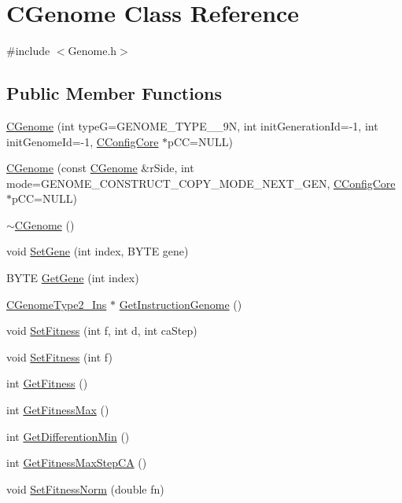 \hypertarget{classCGenome}{
\section{CGenome Class Reference}
\label{classCGenome}
}


{\ttfamily \#include $<$Genome.h$>$}\subsection*{Public Member Functions}
\begin{DoxyCompactItemize}
\item 
\hyperlink{classCGenome_a457e2d373926103a835472d689e8e2e7}{CGenome} (int typeG=GENOME\_\-TYPE\_\_\-9N, int initGenerationId=-\/1, int initGenomeId=-\/1, \hyperlink{classCConfigCore}{CConfigCore} $\ast$pCC=NULL)
\item 
\hyperlink{classCGenome_afe7e2e3d4f8d7640c72a3a392147b08a}{CGenome} (const \hyperlink{classCGenome}{CGenome} \&rSide, int mode=GENOME\_\-CONSTRUCT\_\-COPY\_\-MODE\_\-NEXT\_\-GEN, \hyperlink{classCConfigCore}{CConfigCore} $\ast$pCC=NULL)
\item 
\hyperlink{classCGenome_a6ed12f20c2ca1f53498046b584acb01b}{$\sim$CGenome} ()
\item 
void \hyperlink{classCGenome_ad657f8d74e59406cd4c204de9de7b521}{SetGene} (int index, BYTE gene)
\item 
BYTE \hyperlink{classCGenome_a63ed6158c66292bc3934b8b0321205a7}{GetGene} (int index)
\item 
\hyperlink{classCGenomeType2__Ins}{CGenomeType2\_\-Ins} $\ast$ \hyperlink{classCGenome_aa39c3fd7b912f6d3c9a6ea6b21f53e93}{GetInstructionGenome} ()
\item 
void \hyperlink{classCGenome_a55e277b9ac07a547125764452d9955e6}{SetFitness} (int f, int d, int caStep)
\item 
void \hyperlink{classCGenome_acd37f114e0f35ce1e9fc6aaeeb1e7906}{SetFitness} (int f)
\item 
int \hyperlink{classCGenome_ab377704570de61d40c5c35cbc4038b8f}{GetFitness} ()
\item 
int \hyperlink{classCGenome_a5ca3b39ec73b06b0bd2c6c15e058c692}{GetFitnessMax} ()
\item 
int \hyperlink{classCGenome_a7d7ddf14f33e67482827aac0a6dfe10c}{GetDifferentionMin} ()
\item 
int \hyperlink{classCGenome_add91fda87f3065245ca2cdf280272b60}{GetFitnessMaxStepCA} ()
\item 
void \hyperlink{classCGenome_a7c7e21d4d46a594aae09229a2aa5d814}{SetFitnessNorm} (double fn)

\end{DoxyCompactItemize}
